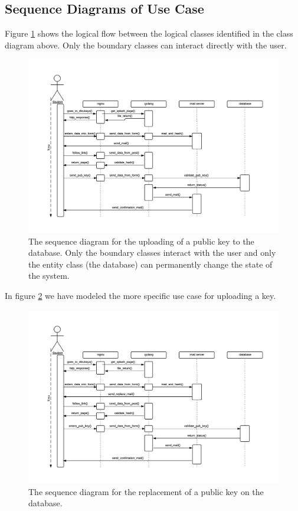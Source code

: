 \documentclass[11pt,a4paper]{report}
\begin{document}
\subsection{Sequence Diagrams of Use Case}\label{subsec:Sequence_diagram_Use_case_model}
Figure \ref{fig:sequence_diagram} shows the logical flow between the logical classes identified in the class diagram above. Only the boundary classes can interact directly with the user.
\begin{figure}[H]
    \centering
    \includegraphics[width=1.2\textwidth]{pictures/sequence_diagram_upload}
    \caption{The sequence diagram for the uploading of a public key to the database. Only the boundary classes interact with the user and only the entity class (the database) can permanently change the state of the system.}
    \label{fig:sequence_diagram}
\end{figure}

In figure \ref{fig:use_case_diagram_example_two} we have modeled the more specific use case for uploading a key.

\begin{figure}[H]
    \centering
    \includegraphics[width=1.2\textwidth]{pictures/sequence_diagram_replace}
     \caption{The sequence diagram for the replacement of a public key on the database.}
    \label{fig:use_case_diagram_example_two}
\end{figure}
\end{document}
